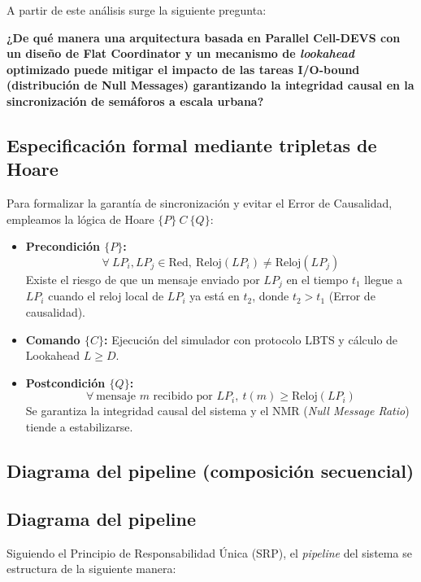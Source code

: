 \documentclass[12pt]{article}
\begin{document}
A partir de este análisis surge la siguiente pregunta:

\textbf{¿De qué manera una arquitectura basada en Parallel Cell-DEVS con un diseño de Flat Coordinator y un mecanismo de \textit{lookahead} optimizado puede mitigar el impacto de las tareas I/O-bound (distribución de Null Messages) garantizando la integridad causal en la sincronización de semáforos a escala urbana?}

\subsection{Especificación formal mediante tripletas de Hoare}

Para formalizar la garantía de sincronización y evitar el Error de Causalidad, empleamos la lógica de Hoare $\{P\} \ C \ \{Q\}$:

\begin{itemize}
    \item \textbf{Precondición $\{P\}$:} 
    $$ \forall \ LP_i, LP_j \in \text{Red}, \ \text{Reloj}(LP_i) \neq \text{Reloj}(LP_j) $$
    Existe el riesgo de que un mensaje enviado por $LP_j$ en el tiempo $t_1$ llegue a $LP_i$ cuando el reloj local de $LP_i$ ya está en $t_2$, donde $t_2 > t_1$ (Error de causalidad).
    
    \item \textbf{Comando $\{C\}$:} Ejecución del simulador con protocolo LBTS y cálculo de Lookahead $L \ge D$.
    
    \item \textbf{Postcondición $\{Q\}$:} 
    $$ \forall \ \text{mensaje } m \text{ recibido por } LP_i, \ t(m) \ge \text{Reloj}(LP_i) $$
    Se garantiza la integridad causal del sistema y el NMR (\textit{Null Message Ratio}) tiende a estabilizarse.
\end{itemize}

\subsection{Diagrama del pipeline (composición secuencial)}

\subsection{Diagrama del pipeline}
Siguiendo el Principio de Responsabilidad Única (SRP), el \textit{pipeline} del sistema se estructura de la siguiente manera:

\vspace{0.5cm}
\end{document}
